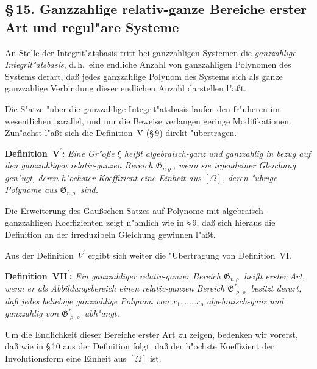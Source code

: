 \documentclass[11pt,a4paper]{article}
\begin{document}
\subsection*{\S\,15. Ganzzahlige relativ-ganze Bereiche erster Art und regul"{a}re Systeme}

An Stelle der Integrit"{a}tsbasis tritt bei ganzzahligen Systemen die
\emph{ganzzahlige Integrit"{a}tsbasis}, d.\,h.\ eine endliche Anzahl von ganzzahligen
Polynomen des Systems derart, da\ss{} jedes ganzzahlige Polynom des Systems
sich als ganze ganzzahlige Verbindung dieser endlichen Anzahl darstellen
l"{a}\ss{}t.

Die S"{a}tze "{u}ber die ganzzahlige Integrit"{a}tsbasis laufen den fr"{u}heren im
wesentlichen parallel, und nur die Beweise verlangen geringe Modifikationen.
Zun"{a}chst l"{a}\ss{}t sich die Definition~V (\S\,9) direkt "{u}bertragen.

\medskip
\noindent
\textbf{Definition~$\mathbf{V}^{\boldsymbol{\prime}}$:} \emph{Eine Gr"{o}\ss{}e $\xi$ hei\ss{}t \emph{algebraisch-ganz und
ganzzahlig} in bezug auf den ganzzahligen relativ-ganzen Bereich $\mathfrak{G}_{n\varrho}$,
wenn sie irgendeiner Gleichung gen"{u}gt, deren h"{o}chster Koeffizient eine
Einheit aus $[\Omega]$, deren "{u}brige Polynome aus $\mathfrak{G}_{n\varrho}$ sind.}

Die Erweiterung des Gau\ss{}schen Satzes auf Polynome mit algebraisch-
ganzzahligen Koeffizienten zeigt n"{a}mlich wie in \S\,9, da\ss{} sich hieraus die
Definition an der irreduzibeln Gleichung gewinnen l"{a}\ss{}t.

Aus der Definition~$V^{\prime}$ ergibt sich weiter die "{U}bertragung von
Definition~VI.

\medskip
\noindent
\textbf{Definition~$\mathbf{VII}^{\boldsymbol{\prime}}$:} \emph{Ein ganzzahliger relativ-ganzer Bereich
$\mathfrak{G}_{n\varrho}$ hei\ss{}t \emph{erster Art}, wenn er als Abbildungsbereich einen relativ-ganzen
Bereich $\mathfrak{G}_{\varrho\varrho}^{*}$ besitzt derart, da\ss{} jedes beliebige ganzzahlige Polynom von
$x_{1},\dots,x_{\varrho}$ algebraisch-ganz und ganzzahlig von $\mathfrak{G}_{\varrho\varrho}^{*}$ abh"{a}ngt.}

Um die Endlichkeit dieser Bereiche erster Art zu zeigen, bedenken
wir vorerst, da\ss{} wie in \S\,10 aus der Definition folgt, da\ss{} der h"{o}chste
Koeffizient der Involutionsform eine Einheit aus $[\Omega]$ ist.
\end{document}
